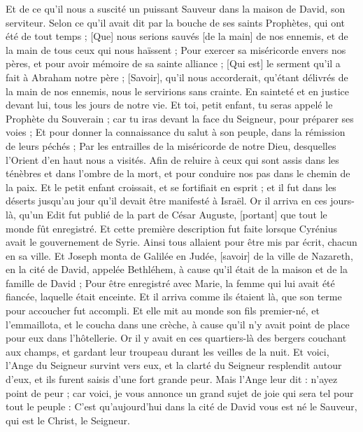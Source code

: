 \begin{multicols}{2}
Et de ce qu'il nous a suscité un puissant Sauveur dans la maison de David, son serviteur.
Selon ce qu'il avait dit par la bouche de ses saints Prophètes, qui ont été de tout temps ;
[Que] nous serions sauvés [de la main] de nos ennemis, et de la main de tous ceux qui nous haïssent ;
Pour exercer sa miséricorde envers nos pères, et pour avoir mémoire de sa sainte alliance ;
[Qui est] le serment qu'il a fait à Abraham notre père ;
[Savoir], qu'il nous accorderait, qu'étant délivrés de la main de nos ennemis, nous le servirions sans crainte.
En sainteté et en justice devant lui, tous les jours de notre vie.
Et toi, petit enfant, tu seras appelé le Prophète du Souverain ; car tu iras devant la face du Seigneur, pour préparer ses voies ;
Et pour donner la connaissance du salut à son peuple, dans la rémission de leurs péchés ;
Par les entrailles de la miséricorde de notre Dieu, desquelles l'Orient d'en haut nous a visités.
Afin de reluire à ceux qui sont assis dans les ténèbres et dans l'ombre de la mort, et pour conduire nos pas dans le chemin de la paix.
Et le petit enfant croissait, et se fortifiait en esprit ; et il fut dans les déserts jusqu'au jour qu'il devait être manifesté à Israël.
\VerseOne{}Or il arriva en ces jours-là, qu'un Edit fut publié de la part de César Auguste, [portant] que tout le monde fût enregistré.
Et cette première description fut faite lorsque Cyrénius avait le gouvernement de Syrie.
Ainsi tous allaient pour être mis par écrit, chacun en sa ville.
Et Joseph monta de Galilée en Judée, [savoir] de la ville de Nazareth, en la cité de David, appelée Bethléhem, à cause qu'il était de la maison et de la famille de David ;
Pour être enregistré avec Marie, la femme qui lui avait été fiancée, laquelle était enceinte.
Et il arriva comme ils étaient là, que son terme pour accoucher fut accompli.
Et elle mit au monde son fils premier-né, et l'emmaillota, et le coucha dans une crèche, à cause qu'il n'y avait point de place pour eux dans l'hôtellerie.
Or il y avait en ces quartiers-là des bergers couchant aux champs, et gardant leur troupeau durant les veilles de la nuit.
Et voici, l'Ange du Seigneur survint vers eux, et la clarté du Seigneur resplendit autour d'eux, et ils furent saisis d'une fort grande peur.
Mais l'Ange leur dit : n'ayez point de peur ; car voici, je vous annonce un grand sujet de joie qui sera tel pour tout le peuple :
C'est qu'aujourd'hui dans la cité de David vous est né le Sauveur, qui est le Christ, le Seigneur.

\end{multicols}
